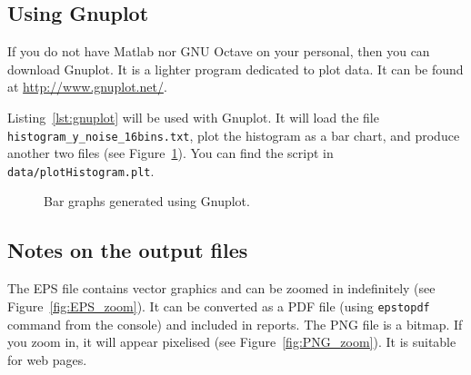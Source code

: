 \documentclass[english,a4paper,12pt,oneside]{article}
\begin{document}
\subsection*{Using Gnuplot}

If you do not have Matlab nor GNU Octave on your personal, then you can download Gnuplot. 
It is a lighter program dedicated to plot data. 
It can be found at \url{http://www.gnuplot.net/}. 
\newpage


Listing~\ref{lst:gnuplot} will be used with Gnuplot. It will load the file \verb+histogram_y_noise_16bins.txt+, plot the histogram as a bar chart,  and produce another two files (see Figure~\ref{fig:gnuplot}).
You can find the script in \verb+data/plotHistogram.plt+. 


\begin{figure}[!h]
\centering
{}\hfill
{}
\caption{\label{fig:gnuplot}Bar graphs generated using Gnuplot.}
\end{figure}

\subsection*{Notes on the output files}

The EPS file contains vector graphics and can be zoomed in indefinitely (see Figure~\ref{fig:EPS_zoom}). 
It can be converted as a PDF file (using \verb+epstopdf+ command from the console) and included in reports. 
The PNG file is a bitmap. If you zoom in, it will appear pixelised (see Figure~\ref{fig:PNG_zoom}). 
It is suitable for web pages.
\end{document}
